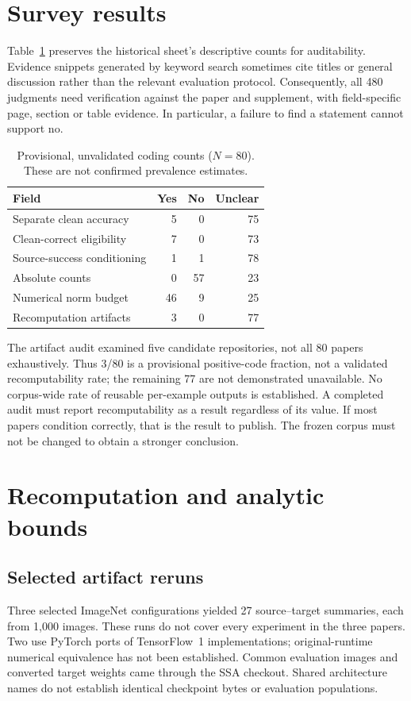 \documentclass[10pt]{article}
\begin{document}
\section{Survey results}
Table~\ref{tab:survey} preserves the historical sheet's descriptive counts for auditability. Evidence snippets generated by keyword search sometimes cite titles or general discussion rather than the relevant evaluation protocol. Consequently, all 480 judgments need verification against the paper and supplement, with field-specific page, section or table evidence. In particular, a failure to find a statement cannot support no.

\begin{table}[t]
\centering
\caption{Provisional, unvalidated coding counts ($N=80$). These are not confirmed prevalence estimates.}
\label{tab:survey}
\begin{tabular}{lrrr}
\toprule
Field & Yes & No & Unclear\\
\midrule
Separate clean accuracy & 5 & 0 & 75\\
Clean-correct eligibility & 7 & 0 & 73\\
Source-success conditioning & 1 & 1 & 78\\
Absolute counts & 0 & 57 & 23\\
Numerical norm budget & 46 & 9 & 25\\
Recomputation artifacts & 3 & 0 & 77\\
\bottomrule
\end{tabular}
\end{table}

The artifact audit examined five candidate repositories, not all 80 papers exhaustively. Thus 3/80 is a provisional positive-code fraction, not a validated recomputability rate; the remaining 77 are not demonstrated unavailable. No corpus-wide rate of reusable per-example outputs is established. A completed audit must report recomputability as a result regardless of its value. If most papers condition correctly, that is the result to publish. The frozen corpus must not be changed to obtain a stronger conclusion.

\section{Recomputation and analytic bounds}
\subsection{Selected artifact reruns}
Three selected ImageNet configurations yielded 27 source--target summaries, each from 1,000 images. These runs do not cover every experiment in the three papers. Two use PyTorch ports of TensorFlow~1 implementations; original-runtime numerical equivalence has not been established. Common evaluation images and converted target weights came through the SSA checkout. Shared architecture names do not establish identical checkpoint bytes or evaluation populations.
\end{document}
